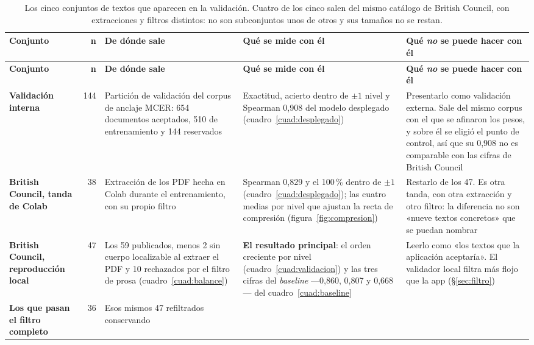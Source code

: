 \documentclass[11pt,a4paper]{article}
\newcommand{\pct}{\,\%}
\begin{document}
\begin{footnotesize}
\begin{longtable}{@{}L{1.9cm} r L{3.0cm} L{3.6cm} L{4.3cm}@{}}
\caption{Los cinco conjuntos de textos que aparecen en la validación. Cuatro de los cinco
salen del mismo catálogo de British Council, con extracciones y filtros distintos: no son
subconjuntos unos de otros y sus tamaños no se restan.}
\label{cuad:conjuntos}\\
\toprule
\textbf{Conjunto} & \textbf{n} & \textbf{De dónde sale} & \textbf{Qué se mide con él} &
\textbf{Qué \emph{no} se puede hacer con él} \\
\midrule
\endfirsthead
\toprule
\textbf{Conjunto} & \textbf{n} & \textbf{De dónde sale} & \textbf{Qué se mide con él} &
\textbf{Qué \emph{no} se puede hacer con él} \\
\midrule
\endhead
\bottomrule
\endfoot
\bottomrule
\endlastfoot
\textbf{Validación interna} & 144 & Partición de validación del corpus de anclaje
MCER: 654 documentos aceptados, 510 de entrenamiento y 144 reservados & Exactitud,
acierto dentro de $\pm 1$ nivel y Spearman 0,908 del modelo desplegado
(cuadro~\ref{cuad:desplegado}) & Presentarlo como validación externa. Sale del mismo
corpus con el que se afinaron los pesos, y sobre él se eligió el punto de control, así que
su 0,908 no es comparable con las cifras de British Council \\
\addlinespace
\textbf{British Council, tanda de Colab} & 38 & Extracción de los PDF hecha en Colab
durante el entrenamiento, con su propio filtro & Spearman 0,829 y el 100\pct{} dentro de
$\pm 1$ (cuadro~\ref{cuad:desplegado}); las cuatro medias por nivel que ajustan la recta
de compresión (figura~\ref{fig:compresion}) & Restarlo de los 47. Es otra tanda, con otra
extracción y otro filtro: la diferencia no son «nueve textos concretos» que se puedan
nombrar \\
\addlinespace
\textbf{British Council, reproducción local} & 47 & Los 59 publicados, menos 2 sin cuerpo
localizable al extraer el PDF y 10 rechazados por el filtro de prosa
(cuadro~\ref{cuad:balance}) & \textbf{El resultado principal}: el orden creciente por
nivel (cuadro~\ref{cuad:validacion}) y las tres cifras del \emph{baseline} ---0,860,
0,807 y 0,668--- del cuadro~\ref{cuad:baseline} & Leerlo como «los textos que la
aplicación aceptaría». El validador local filtra más flojo que la app
(§\ref{sec:filtro}) \\
\addlinespace
\textbf{Los que pasan el filtro completo} & 36 & Esos mismos 47 refiltrados conservando

\end{longtable}
\end{footnotesize}
\end{document}
